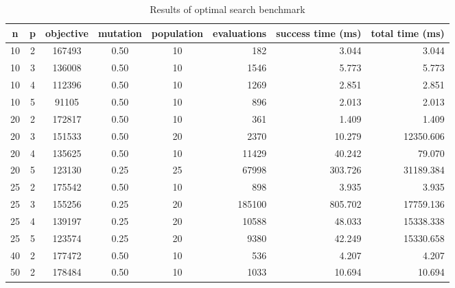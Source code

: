 \begin{table}
\caption{Results of optimal search benchmark}
\label{tb:optimal_benchmark}
\begin{center}
\begin{tabular}{|c|c|c|c|c|r|r|r|}
\hline
n & p & objective & mutation & population & evaluations & success time (ms) & total time (ms) \\
\hline
10 & 2 & 167493 & 0.50 & 10 & 182 & 3.044 & 3.044 \\
10 & 3 & 136008 & 0.50 & 10 & 1546 & 5.773 & 5.773 \\
10 & 4 & 112396 & 0.50 & 10 & 1269 & 2.851 & 2.851 \\
10 & 5 & 91105 & 0.50 & 10 & 896 & 2.013 & 2.013 \\
20 & 2 & 172817 & 0.50 & 10 & 361 & 1.409 & 1.409 \\
20 & 3 & 151533 & 0.50 & 20 & 2370 & 10.279 & 12350.606 \\
20 & 4 & 135625 & 0.50 & 10 & 11429 & 40.242 & 79.070 \\
20 & 5 & 123130 & 0.25 & 25 & 67998 & 303.726 & 31189.384 \\
25 & 2 & 175542 & 0.50 & 10 & 898 & 3.935 & 3.935 \\
25 & 3 & 155256 & 0.25 & 20 & 185100 & 805.702 & 17759.136 \\
25 & 4 & 139197 & 0.25 & 20 & 10588 & 48.033 & 15338.338 \\
25 & 5 & 123574 & 0.25 & 20 & 9380 & 42.249 & 15330.658 \\
40 & 2 & 177472 & 0.50 & 10 & 536 & 4.207 & 4.207 \\
50 & 2 & 178484 & 0.50 & 10 & 1033 & 10.694 & 10.694 \\
\hline
\end{tabular}
\end{center}
\end{table}
